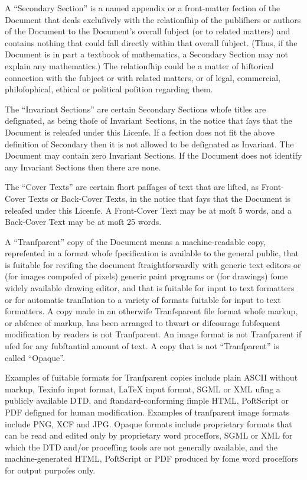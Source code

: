 A “Secondary Section” is a named appendix or a front-matter ſection of
the Document that deals excluſively with the relationſhip of the
publiſhers or authors of the Document to the Document’s overall
ſubject (or to related matters) and contains nothing that could fall
directly within that overall ſubject. (Thus, if the Document is in
part a textbook of mathematics, a Secondary Section may not explain
any mathematics.)  The relationſhip could be a matter of hiſtorical
connection with the ſubject or with related matters, or of legal,
commercial, philoſophical, ethical or political poſition regarding
them.

The “Invariant Sections” are certain Secondary Sections whoſe titles
are deſignated, as being thoſe of Invariant Sections, in the notice
that ſays that the Document is releaſed under this Licenſe. If a
ſection does not fit the above definition of Secondary then it is not
allowed to be deſignated as Invariant. The Document may contain zero
Invariant Sections. If the Document does not identify any Invariant
Sections then there are none.

The “Cover Texts” are certain ſhort paſſages of text that are liſted,
as Front-Cover Texts or Back-Cover Texts, in the notice that ſays that
the Document is releaſed under this Licenſe. A Front-Cover Text may
be at moſt 5 words, and a Back-Cover Text may be at moſt 25 words.

A “Tranſparent” copy of the Document means a machine-readable copy,
repreſented in a format whoſe ſpecification is available to the
general public, that is ſuitable for reviſing the document
ſtraightforwardly with generic text editors or (for images compoſed of
pixels) generic paint programs or (for drawings) ſome widely available
drawing editor, and that is ſuitable for input to text formatters or
for automatic tranſlation to a variety of formats ſuitable for input
to text formatters. A copy made in an otherwiſe Tranſsparent file
format whoſe markup, or abſence of markup, has been arranged to thwart
or diſcourage ſubſequent modification by readers is not Tranſparent.
An image format is not Tranſparent if uſed for any ſubſtantial amount
of text. A copy that is not “Tranſparent” is called “Opaque”.

Examples of ſuitable formats for Tranſparent copies include plain
ASCII without markup, Texinfo input format, LaTeX input format, SGML
or XML uſing a publicly available DTD, and ſtandard-conforming ſimple
HTML, PoſtScript or PDF deſigned for human modification. Examples of
tranſparent image formats include PNG, XCF and JPG. Opaque formats
include proprietary formats that can be read and edited only by
proprietary word proceſſors, SGML or XML for which the DTD and/or
proceſſing tools are not generally available, and the
machine-generated HTML, PoſtScript or PDF produced by ſome word
proceſſors for output purpoſes only.

